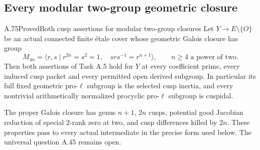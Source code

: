 \subsection{Every modular two-group geometric closure}

\begin{statement}{A.75}{Proved}{Both cusp assertions for modular two-group closures}
Let \(Y\to E\setminus\{O\}\) be an actual connected finite
\'{e}tale cover whose geometric Galois closure has group
\[
 M_{4n}=\langle r,s\mid r^{2n}=s^2=1,\quad
                        srs^{-1}=r^{n+1}\rangle,
 \qquad n\ge4\text{ a power of two}.                 \tag{A.75.1}
\]
Then both assertions of Task A.5 hold for \(Y\) at every
coefficient prime, every induced cusp packet and every permitted
open derived subgroup. In particular its full fixed geometric
pro-\(\ell\) subgroup is the selected cusp inertia, and every
nontrivial arithmetically normalized procyclic pro-\(\ell\)
subgroup is cuspidal.

The proper Galois closure has genus \(n+1\), \(2n\) cusps,
potential good Jacobian reduction of special \(2\)-rank zero
at two, and cusp differences killed by \(2n\). These properties
pass to every actual intermediate in the precise form used below.
The universal question A.45 remains open.
\end{statement}

